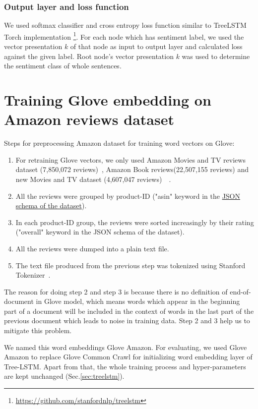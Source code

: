 \subsubsection{Output layer and loss function}
We used softmax classifier and cross entropy loss function similar to TreeLSTM \cite{treelstm} Torch implementation \footnote{\url{https://github.com/stanfordnlp/treelstm}}.
For each node which has sentiment label, we used the vector presentation $k$ of that node as input to output layer and calculated loss against the given label.
Root node's vector presentation $k$ was used to determine the sentiment class of whole sentences.

\hypertarget{sec:Glove-Amazon}{\section{Training Glove embedding on Amazon reviews dataset}}
\label{sec:gloveamazone}
Steps for preprocessing Amazon dataset for training word vectors on Glove:
\begin{enumerate}
\item For retraining Glove vectors, we only used Amazon Movies and TV reviews dataset (7,850,072 reviews)~\cite{mcauley2013hidden}, Amazon Book reviews(22,507,155 reviews) and new Movies and TV dataset (4,607,047 reviews)~\cite{McAuleyTSH15}~\cite{HeM16}.
\item All the reviews were grouped by product-ID ("asin" keyword in the \hyperref[sec:amazon]{JSON schema of the dataset}).
\item In each product-ID group, the reviews were sorted increasingly by their rating ("overall" keyword in the JSON schema of the dataset).
\item All the reviews were dumped into a plain text file.
\item The text file produced from the previous step was tokenized using Stanford Tokenizer~\cite{tokenizerpart}.
\end{enumerate}

The reason for doing step 2 and step 3 is because there is no definition of end-of-document in Glove model, which means words which appear in the beginning part of a document will be included in the context of words in the last part of the previous document which leads to noise in training data. Step 2 and 3 help us to mitigate this problem.

We named this word embeddings Glove Amazon.
For evaluating, we used Glove Amazon to replace Glove Common Crawl for initializing word embedding layer of Tree-LSTM.
Apart from that, the whole training process and hyper-parameters are kept unchanged (Sec.\ref{sec:treelstm}).

